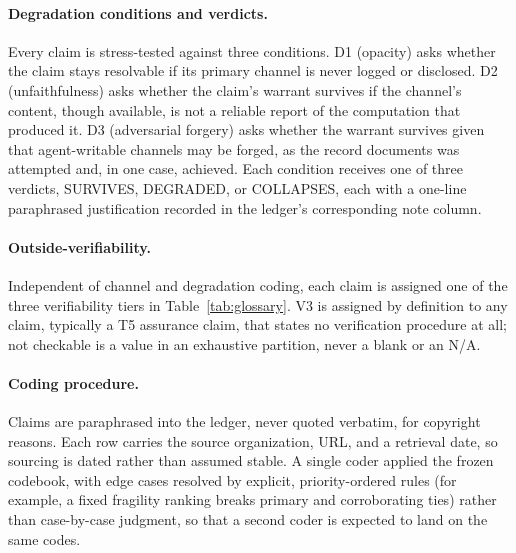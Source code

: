 \documentclass[10pt]{article}
\begin{document}
\paragraph{Degradation conditions and verdicts.} Every claim is stress-tested
against three conditions. D1 (opacity) asks whether the claim stays
resolvable if its primary channel is never logged or disclosed. D2
(unfaithfulness) asks whether the claim's warrant survives if the channel's
content, though available, is not a reliable report of the computation that
produced it. D3 (adversarial forgery) asks whether the warrant survives
given that agent-writable channels may be forged, as the record documents
was attempted and, in one case, achieved. Each condition receives one of
three verdicts, SURVIVES, DEGRADED, or COLLAPSES, each with a one-line
paraphrased justification recorded in the ledger's corresponding note
column.

\paragraph{Outside-verifiability.} Independent of channel and degradation
coding, each claim is assigned one of the three verifiability tiers in
Table~\ref{tab:glossary}. V3 is assigned by definition to any claim,
typically a T5 assurance claim, that states no verification procedure at
all; not checkable is a value in an exhaustive partition, never a blank or
an N/A.

\paragraph{Coding procedure.} Claims are paraphrased into the ledger, never
quoted verbatim, for copyright reasons. Each row carries the source
organization, URL, and a retrieval date, so sourcing is dated rather than
assumed stable. A single coder applied the frozen codebook, with edge cases
resolved by explicit, priority-ordered rules (for example, a fixed
fragility ranking breaks primary and corroborating ties) rather than
case-by-case judgment, so that a second coder is expected to land on the
same codes.
\end{document}
